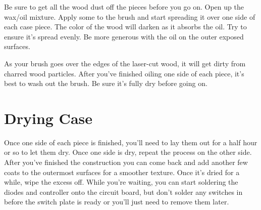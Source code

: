 \documentclass{article}
\begin{document}
Be sure to get all the wood dust off the pieces before you go on. Open
up the wax/oil mixture. Apply some to the brush and start spreading it over
one side of each case piece. The color of the wood will darken as it
absorbs the oil. Try to ensure it's spread evenly. Be more generous
with the oil on the outer exposed surfaces.

\vspace{1em}
\noindent{}
\vspace{1em}

As your brush goes over the edges of the laser-cut wood, it will get
dirty from charred wood particles. After you've finished oiling one
side of each piece, it's best to wash out the brush. Be sure it's
fully dry before going on.

\section{Drying Case}

Once one side of each piece is finished, you'll need to lay them out
for a half hour or so to let them dry. Once one side is dry, repeat
the process on the other side. After you've finished the construction
you can come back and add another few coats to the outermost surfaces
for a smoother texture. Once it's dried for a while, wipe the excess
off. While you're waiting, you can start soldering the diodes and
controller onto the circuit board, but don't solder any switches in
before the switch plate is ready or you'll just need to remove them
later.
\end{document}
